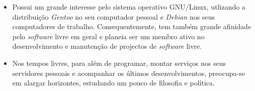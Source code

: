 \documentclass[11pt,a4paper,sans]{moderncv} %
\begin{document}
\vspace{6pt}

\begin{itemize}

\item{Possui um grande interesse pelo sistema operativo GNU/Linux, utlizando a
    distribuição \textit{Gentoo} no seu computador pessoal e \textit{Debian} nos
    seus computadores de trabalho.  Consequentemente, tem também grande
    afinidade pelo \textit{software} livre em geral e planeia ser um membro
    ativo no desenvolvimento e manutenção de projectos de \textit{software}
    livre.}

\vspace{6pt}

\item{Nos tempos livres, para além de programar, montar serviços nos seus
    servidores pessoais e acompanhar os últimos desenvolvimentos, preocupa-se em
    alargar horizontes, estudando um pouco de filosofia e política.}

\end{itemize}


\nocite{*}



\end{document}
